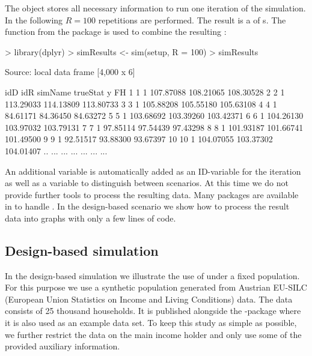 \documentclass[article]{ajs}
\begin{document}
The object  stores all necessary information to run one iteration of the simulation. In the following $R = 100$ repetitions are performed. The result is a  of s. The function  from the package  is used to combine the resulting :

\begin{Schunk}
\begin{Sinput}
> library(dplyr)
> simResults <- sim(setup, R = 100) %
> simResults %
\end{Sinput}
\begin{Soutput}
Source: local data frame [4,000 x 6]

   idD idR simName  trueStat         y        FH
1    1   1         107.87088 108.21065 108.30528
2    2   1         113.29033 114.13809 113.80733
3    3   1         105.88208 105.55180 105.63108
4    4   1          84.61171  84.36450  84.63272
5    5   1         103.68692 103.39260 103.42371
6    6   1         104.26130 103.97032 103.79131
7    7   1          97.85114  97.54439  97.43298
8    8   1         101.93187 101.66741 101.49500
9    9   1          92.51517  93.88300  93.67397
10  10   1         104.07055 103.37302 104.01407
.. ... ...     ...       ...       ...       ...
\end{Soutput}
\end{Schunk}

An additional variable  is automatically added as an ID-variable for the iteration as well as a variable  to distinguish between scenarios. At this time we do not provide further tools to process the resulting data. Many packages are available in  to handle . In the design-based scenario we show how to process the result data into graphs with only a few lines of code.

\subsection{Design-based simulation}
\label{sec:csDesign}

In the design-based simulation we illustrate the use of  under a fixed population. For this purpose we use a synthetic population generated from Austrian EU-SILC (European Union Statistics on Income and Living Conditions) data. The data consists of 25 thousand households. It is published alongside the -package  \citep{Alf10} where it is also used as an example data set. To keep this study as simple as possible, we further restrict the data on the main income holder and only use some of the provided auxiliary information.
\end{document}
